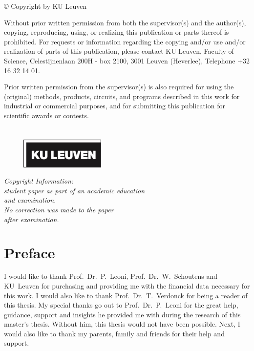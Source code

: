 \thispagestyle{empty}
\null
\newpage

\thispagestyle{empty}
\null
\vfill

© Copyright by KU Leuven

Without prior written permission from both the supervisor(s) and the author(s), copying, reproducing, using, or realizing this publication or parts thereof is prohibited. For requests or information regarding the copying and/or use and/or realization of parts of this publication, please contact KU Leuven, Faculty of Science, Celestijnenlaan 200H - box 2100, 3001 Leuven (Heverlee), Telephone +32 16 32 14 01.

Prior written permission from the supervisor(s) is also required for using the (original) methods, products, circuits, and programs described in this work for industrial or commercial purposes, and for submitting this publication for scientific awards or contests.

\newpage

\thispagestyle{empty}
\null
\newpage

\chapter*{}
\vspace*{-2cm}
\begin{figure}
  \centering
  \includegraphics[width=0.375\textwidth]{Images/KUL_black.pdf}
\end{figure}
\vspace{2.75cm}
\begin{center}
  {\LARGE\textit{Copyright Information:\\
      student paper as part of an academic education\\
      and examination.\\
      No correction was made to the paper\\
  after examination.}}
\end{center}
\newpage

\thispagestyle{empty}
\null
\newpage

\chapter{Preface}
I would like to thank Prof.~Dr.~P.~Leoni, Prof.~Dr.~W.~Schoutens and KU~Leuven for purchasing and providing me with the financial data necessary for this work. I would also like to thank Prof.~Dr.~T.~Verdonck for being a reader of this thesis. My special thanks go out to Prof.~Dr.~P.~Leoni for the great help, guidance, support and insights he provided me with during the research of this master's thesis. Without him, this thesis would not have been possible. Next, I would also like to thank my parents, family and friends for their help and support.

